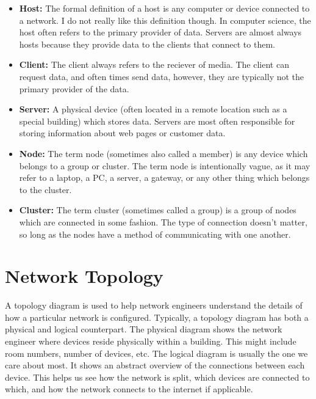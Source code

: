 \documentclass{article}
\begin{document}
\begin{itemize}

\item{%
    \textbf{Host:} The formal definition of a host is any computer or device connected to a network. I do not
    really like this definition though. In computer science, the host often refers to the primary provider of
    data. Servers are almost always hosts because they provide data to the clients that connect to them.
}

\item{%
    \textbf{Client:} The client always refers to the reciever of media. The client can request data, and often
    times send data, however, they are typically not the primary provider of the data.
}

\item{%
    \textbf{Server:} A physical device (often located in a remote location such as a special building) which
    stores data. Servers are most often responsible for storing information about web pages or customer data.
}

\item{%
    \textbf{Node:} The term node (sometimes also called a member) is any device which belongs to a group or
    cluster. The term node is intentionally vague, as it may refer to a laptop, a PC, a server, a gateway, or
    any other thing which belongs to the cluster.
}

\item{%
    \textbf{Cluster:} The term cluster (sometimes called a group) is a group of nodes which are connected in
    some fashion. The type of connection doesn't matter, so long as the nodes have a method of communicating
    with one another.
}

\end{itemize}

\section{Network Topology}

A topology diagram is used to help network engineers understand the details of how a particular network is
configured. Typically, a topology diagram has both a physical and logical counterpart. The physical diagram
shows the network engineer where devices reside physically within a building. This might include room numbers,
number of devices, etc. The logical diagram is usually the one we care about most. It shows an abstract
overview of the connections between each device. This helps us see how the network is split, which devices are
connected to which, and how the network connects to the internet if applicable.
\end{document}
